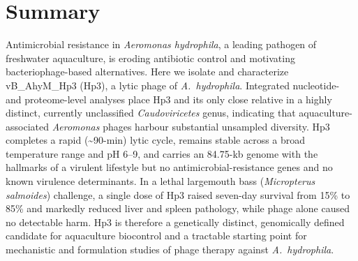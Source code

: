 \documentclass[11pt,a4paper]{article}
\begin{document}
\section*{Summary}
\noindent
Antimicrobial resistance in \emph{Aeromonas hydrophila}, a leading pathogen of
freshwater aquaculture, is eroding antibiotic control and motivating
bacteriophage-based alternatives. Here we isolate and characterize
vB\_AhyM\_Hp3 (Hp3), a lytic phage of \emph{A.~hydrophila}. Integrated
nucleotide- and proteome-level analyses place Hp3 and its only close relative
in a highly distinct, currently unclassified \emph{Caudoviricetes} genus,
indicating that aquaculture-associated \emph{Aeromonas} phages harbour
substantial unsampled diversity. Hp3 completes a rapid (\textasciitilde90-min)
lytic cycle, remains stable across a broad temperature range and pH 6--9,
and carries an 84.75-kb genome with the hallmarks of a virulent
lifestyle but no antimicrobial-resistance genes and no known
virulence determinants. In a lethal largemouth bass (\emph{Micropterus
salmoides}) challenge, a single dose of Hp3 raised seven-day survival from
15\% to 85\% and markedly reduced liver and spleen pathology, while phage
alone caused no detectable harm. Hp3 is therefore a genetically distinct,
genomically defined candidate for aquaculture biocontrol and a tractable
starting point for mechanistic and formulation studies of phage therapy
against \emph{A.~hydrophila}.

\bigskip



\end{document}
